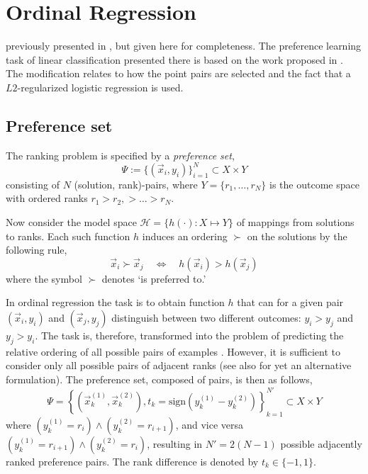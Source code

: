 
\chapter{Ordinal Regression}\label{ch:ordinal} 
 previously presented in 
\cite{Ru06:PPSN}, but given here for completeness. The preference learning task 
of linear classification presented there is based on the work proposed in 
\citep{main:LIBLINEAR,Lin08:newtontrustregion}. 
The modification relates to how the point pairs are selected and the fact that 
a $L2$-regularized logistic regression is used. 

\section{Preference set}
The ranking problem is specified by a \emph{preference set}, 
\begin{equation}
\Psi := \{(\vec{x}_i,y_i)\}_{i=1}^N \subset X \times Y
\end{equation}
consisting of $N$ (solution, rank)-pairs, where $Y=\{r_1,\ldots,r_N\}$ 
is the outcome space with ordered ranks $r_1> r_2,> \ldots > r_N$.  

Now consider the model space $\mathcal{H} = \{h(\cdot) : X \mapsto Y\}$ of 
mappings from solutions to ranks. Each such function $h$ induces an ordering 
$\succ$ on the solutions  by the following rule,
\begin{equation}\label{eq:linear}
	\vec{x}_i \succ \vec{x}_j \quad \Leftrightarrow \quad h(\vec{x}_i) > h(\vec{x}_j)
\end{equation}
where the symbol $\succ$ denotes `is preferred to.' 

In ordinal regression the task is to obtain function $h$ that can for a given pair $(\vec{x}_i,y_i)$ and $(\vec{x}_j,y_j)$ distinguish between two different outcomes: $y_i > y_j$ and $y_j > y_i$. The task is, therefore, transformed into the problem of predicting the relative ordering of all possible pairs of examples \citep{Herbrich00,Joachims02}.  However, it is sufficient to consider only all possible pairs of adjacent ranks (see also \cite{ShaweTaylor04:book} for yet an alternative formulation).  The preference set, composed of pairs, is then as follows,
\begin{equation}
	\Psi = \left\{(\vec{x}_k^{(1)}, \vec{x}_k^{(2)}),t_k=\text{sign}(y_k^{(1)} - 
	y_k^{(2)})\right\}_{k=1}^{N'} \subset X\times Y  \label{eq:PrefSet:problem}
\end{equation}
where $(y_k^{(1)} = r_i) \wedge (y_k^{(2)} = r_{i+1})$, and vice versa 
$(y_k^{(1)} = r_{i+1}) \wedge (y_k^{(2)} = r_{i})$, resulting in $N'=2(N-1)$ 
possible adjacently ranked preference pairs. The rank difference is denoted by 
$t_k\in\{-1,1\}$.

